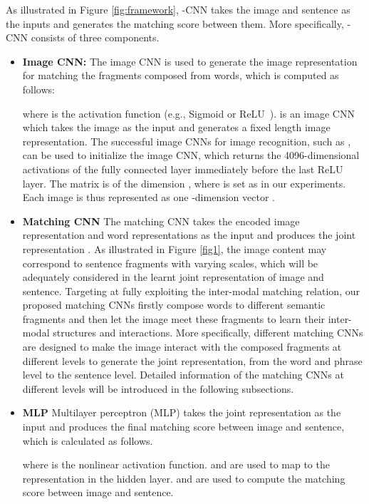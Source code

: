\documentclass[10pt,twocolumn,letterpaper]{article}
\begin{document}
As illustrated in Figure \ref{fig:framework}, -CNN takes the image and sentence as the inputs and generates the matching score between them. More specifically, -CNN consists of three components.
\vspace{-5pt}
\begin{itemize}
  \item {\bf Image CNN:} The image CNN is used to generate the image representation for matching the fragments composed from words, which is computed as follows:

where  is the activation function (e.g., Sigmoid or ReLU~\cite{relu}).  is an image CNN which takes the image as the input and generates a fixed length image representation. The successful image CNNs for image recognition, such as \cite{sermanet_arxiv2014,simonyan_arxiv2014}, can be used to initialize the image CNN, which returns the 4096-dimensional activations of the fully connected layer immediately before the last ReLU layer. The matrix  is of the dimension , where  is set as  in our experiments. Each image is thus represented as one -dimension vector .
\item {\bf Matching CNN}  The matching CNN takes the encoded image representation  and word representations  as the input and produces the joint representation . As illustrated in Figure \ref{fig1}, the image content may correspond to sentence fragments with varying scales, which will be adequately considered in the learnt joint representation of image and sentence. Targeting at fully exploiting the inter-modal matching relation, our proposed matching CNNs firstly compose words to different semantic  fragments and then let the image meet these fragments to learn their inter-modal structures and interactions. More specifically, different matching CNNs are designed to make the image interact with the composed fragments at different levels to generate the joint representation, from the word and phrase level to the sentence level. Detailed information of the matching CNNs at different levels will be introduced in the following subsections.
\item {\bf MLP} Multilayer perceptron (MLP) takes the joint representation  as the input and produces the final matching score between image and sentence, which is calculated as follows.

where  is the nonlinear activation function.  and  are used to map  to the representation in the hidden layer.  and  are used to compute the matching score between image and sentence.

\end{itemize}
\end{document}
